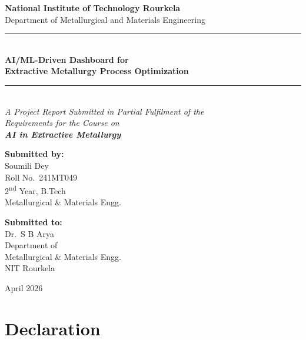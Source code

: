 \documentclass[12pt,a4paper]{report}
\begin{document}
\begin{titlepage}
\centering
\vspace*{1cm}

{\Large \textbf{National Institute of Technology Rourkela}}\\[0.3cm]
{\large Department of Metallurgical and Materials Engineering}\\[1.5cm]

\rule{\textwidth}{1.5pt}\\[0.6cm]
{\LARGE \bfseries AI/ML-Driven Dashboard for\\[0.2cm]
Extractive Metallurgy Process Optimization}\\[0.4cm]
\rule{\textwidth}{1.5pt}\\[1.5cm]

{\large \textit{A Project Report Submitted in Partial Fulfilment of the\\
Requirements for the Course on\\[0.15cm]
\textbf{AI in Extractive Metallurgy}}}\\[2cm]

\begin{minipage}[t]{0.45\textwidth}
\begin{flushleft}
\textbf{Submitted by:}\\[0.2cm]
Soumili Dey\\
Roll No.\ 241MT049\\
2\textsuperscript{nd} Year, B.Tech\\
Metallurgical \& Materials Engg.
\end{flushleft}
\end{minipage}
\hfill
\begin{minipage}[t]{0.45\textwidth}
\begin{flushright}
\textbf{Submitted to:}\\[0.2cm]
Dr.\ S B Arya\\
Department of\\
Metallurgical \& Materials Engg.\\
NIT Rourkela
\end{flushright}
\end{minipage}

\vfill
{\large April 2026}
\end{titlepage}

\chapter*{Declaration}
\end{document}
